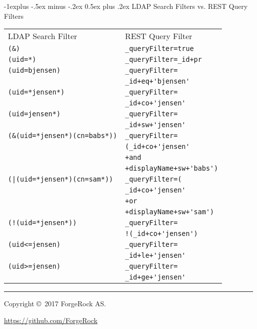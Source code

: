 \documentclass[10pt,landscape]{article}
\makeatletter
\renewcommand{\subsection}{\@startsection{subsection}{2}{0mm}%
                                {-1explus -.5ex minus -.2ex}%
                                {0.5ex plus .2ex}%
                                {\normalfont\small\bfseries}}
\makeatother
\begin{document}
\begin{multicols}{3}
\subsection{LDAP Search Filters vs. REST Query Filters}
\begin{tabular}{@{}ll@{}}
LDAP Search Filter                 & REST Query Filter \\
\verb!(&)!                         & \lstinline!_queryFilter=true! \\
\verb!(uid=*)!                     & \lstinline!_queryFilter=_id+pr! \\
\verb!(uid=bjensen)!               & \lstinline!_queryFilter=! \\
                                   & \lstinline!_id+eq+'bjensen'! \\
\verb!(uid=*jensen*)!              & \lstinline!_queryFilter=! \\
                                   & \lstinline!_id+co+'jensen'! \\
\verb!(uid=jensen*)!               & \lstinline!_queryFilter=! \\
                                   & \lstinline!_id+sw+'jensen'! \\
\verb!(&(uid=*jensen*)(cn=babs*))! & \lstinline!_queryFilter=! \\
                                   & \lstinline!(_id+co+'jensen'! \\
                                   & \lstinline!+and! \\
                                   & \lstinline!+displayName+sw+'babs')! \\
\verb!(|(uid=*jensen*)(cn=sam*))!  & \lstinline!_queryFilter=(! \\
                                   & \lstinline!_id+co+'jensen'! \\
                                   & \lstinline!+or! \\
                                   & \lstinline!+displayName+sw+'sam')! \\
\verb$(!(uid=*jensen*))$           & \lstinline!_queryFilter=! \\
                                   & \lstinline$!(_id+co+'jensen')$ \\
\verb!(uid<=jensen)!               & \lstinline!_queryFilter=! \\
                                   & \lstinline!_id+le+'jensen'! \\
\verb!(uid>=jensen)!               & \lstinline!_queryFilter=! \\
                                   & \lstinline!_id+ge+'jensen'!
\end{tabular}

\rule{0.3\linewidth}{0.25pt}
\scriptsize

Copyright \copyright\ 2017 ForgeRock AS.

\href{https://github.com/ForgeRock}{https://github.com/ForgeRock}

\end{multicols}
\end{document}
